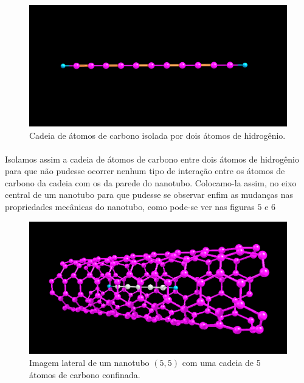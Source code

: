 \documentclass[12pt,a4paper]{report}
\begin{document}
\begin{figure} [!h]
\centering
\includegraphics[scale=0.3]{chain.png}
\caption{Cadeia de átomos de carbono isolada por dois átomos de hidrogênio.}
\end{figure}

\paragraph{}
Isolamos assim a cadeia de átomos de carbono entre dois átomos de hidrogênio para que não pudesse ocorrer nenhum tipo de interação entre os átomos de carbono da cadeia com os da parede do nanotubo. Colocamo-la assim, no eixo central de um nanotubo para que pudesse se observar enfim as mudanças nas propriedades mecânicas do nanotubo, como pode-se ver nas figuras $5$ e $6$

\begin{figure} [!h]
\centering
\includegraphics[scale=0.5]{cntc1.png}
\caption{Imagem lateral de um nanotubo $(5,5)$ com uma cadeia de 5 átomos de carbono confinada.}
\end{figure} 
\end{document}

